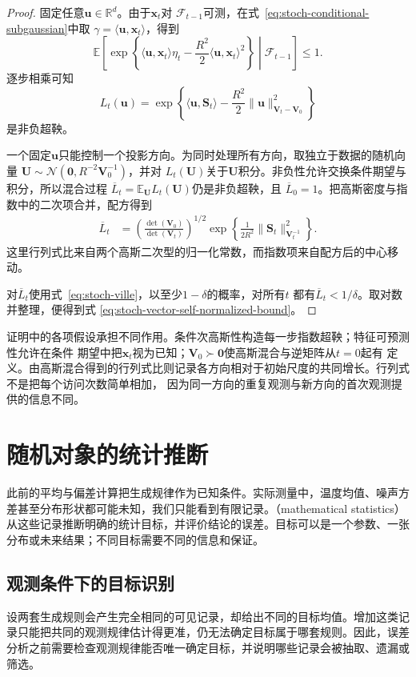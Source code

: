 \begin{proof}
固定任意$\bm{u}\in\mathbb{R}^d$。由于$\bm{x}_t$对
$\mathcal{F}_{t-1}$可测，在式~\eqref{eq:stoch-conditional-subgaussian}中取
$\gamma=\langle\bm{u},\bm{x}_t\rangle$，得到
\[
  \mathbb{E}\!\left[
    \exp\left\{
      \langle\bm{u},\bm{x}_t\rangle\eta_t
      -\frac{R^2}{2}
       \langle\bm{u},\bm{x}_t\rangle^2
    \right\}
    \middle|\mathcal{F}_{t-1}
  \right]
  \leq1.
  \]
逐步相乘可知
\[
  L_t(\bm{u})
  =
  \exp\left\{
    \langle\bm{u},\bm{S}_t\rangle
    -\frac{R^2}{2}
     \lVert\bm{u}\rVert_{\bm{V}_t-\bm{V}_0}^2
  \right\}
\]
是非负超鞅。

一个固定$\bm{u}$只能控制一个投影方向。为同时处理所有方向，取独立于数据的随机向量
$\bm{U}\sim\mathcal{N}(\bm{0},R^{-2}\bm{V}_0^{-1})$，并对
$L_t(\bm{U})$关于$\bm{U}$积分。非负性允许交换条件期望与积分，所以混合过程
$\overline L_t=\mathbb{E}_{\bm{U}}L_t(\bm{U})$仍是非负超鞅，且
$\overline L_0=1$。把高斯密度与指数中的二次项合并，配方得到
\begin{align*}
  \overline L_t
  &=
  \left(
    \frac{\det(\bm{V}_0)}
         {\det(\bm{V}_t)}
  \right)^{1/2}
  \exp\left\{
    \frac{1}{2R^2}
    \lVert\bm{S}_t\rVert_{\bm{V}_t^{-1}}^2
  \right\}.
\end{align*}
这里行列式比来自两个高斯二次型的归一化常数，而指数项来自配方后的中心移动。

对$\overline L_t$使用式~\eqref{eq:stoch-ville}，以至少$1-\delta$的概率，对所有$t$
都有$\overline L_t<1/\delta$。取对数并整理，便得到式
\eqref{eq:stoch-vector-self-normalized-bound}。
\end{proof}

证明中的各项假设承担不同作用。条件次高斯性构造每一步指数超鞅；特征可预测性允许在条件
期望中把$\bm{x}_t$视为已知；$\bm{V}_0\succ\bm{0}$使高斯混合与逆矩阵从$t=0$起有
定义。由高斯混合得到的行列式比则记录各方向相对于初始尺度的共同增长。行列式不是把每个访问次数简单相加，
因为同一方向的重复观测与新方向的首次观测提供的信息不同。

\section{随机对象的统计推断}
\label{sec:rv-inference}
此前的平均与偏差计算把生成规律作为已知条件。实际测量中，温度均值、噪声方差甚至分布形状都可能未知，我们只能看到有限记录。（mathematical statistics）从这些记录推断明确的统计目标，并评价结论的误差。目标可以是一个参数、一张分布或未来结果；不同目标需要不同的信息和保证。

\subsection{观测条件下的目标识别}
\label{sec:stats-targets-data-sources}
设两套生成规则会产生完全相同的可见记录，却给出不同的目标均值。增加这类记录只能把共同的观测规律估计得更准，仍无法确定目标属于哪套规则。因此，误差分析之前需要检查观测规律能否唯一确定目标，并说明哪些记录会被抽取、遗漏或筛选。

